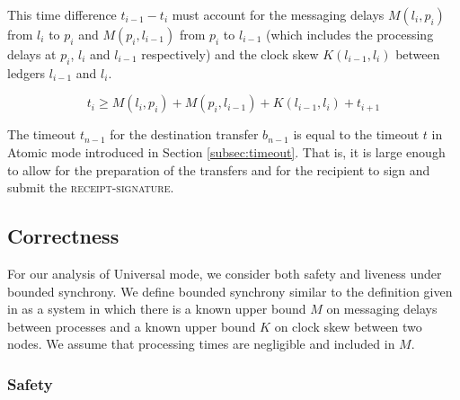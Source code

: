 \documentclass[letterpaper,twocolumn,10pt]{article}
\begin{document}
This time difference $t_{i-1} - t_i$ must account for the messaging delays $M(l_i, p_i)$ from $l_i$ to $p_i$ and $M(p_i, l_{i-1})$ from $p_i$ to $l_{i-1}$ (which includes the processing delays at $p_i$, $l_i$ and $l_{i-1}$ respectively) and the clock skew $K(l_{i-1}, l_i)$ between ledgers $l_{i-1}$ and $l_i$.

\begin{equation}
t_i \geq M(l_i, p_i) + M(p_i, l_{i-1}) + K(l_{i-1}, l_i) + t_{i+1}
\end{equation}

The timeout $t_{n-1}$ for the destination transfer $b_{n-1}$ is equal to the timeout $t$ in Atomic mode introduced in Section \ref{subsec:timeout}. That is, it is large enough to allow for the preparation of the transfers and for the recipient to sign and submit the \textsc{receipt-signature}.





\subsection{Correctness}


For our analysis of Universal mode, we consider both safety and liveness under bounded synchrony. We define bounded synchrony similar to the definition given in \cite{dwork1988consensus} as a system in which there is a known upper bound $M$ on messaging delays between processes and a known upper bound $K$ on clock skew between two nodes. We assume that processing times are negligible and included in $M$.

\subsubsection{Safety}
\end{document}
